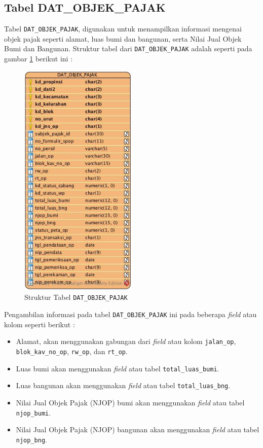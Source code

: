 \subsection{Tabel DAT\_OBJEK\_PAJAK}

Tabel \texttt{DAT\_OBJEK\_PAJAK}, digunakan untuk menampilkan informasi mengenai objek pajak seperti alamat, luas bumi dan bangunan, serta Nilai Jual Objek Bumi dan Bangunan. Struktur tabel dari \texttt{DAT\_OBJEK\_PAJAK} adalah seperti pada gambar \ref{fig:struktur-dat-op} berikut ini :

\begin{figure}[H]
	\centering
	\includegraphics[width=0.5\textwidth]{./resources/struktur-tabel-dat-op}
	\caption{Struktur Tabel \texttt{DAT\_OBJEK\_PAJAK}}
	\label{fig:struktur-dat-op}
\end{figure}

Pengambilan informasi pada tabel \texttt{DAT\_OBJEK\_PAJAK} ini pada beberapa \textit{field} atau kolom seperti berikut :

\begin{itemize}
	\item Alamat, akan menggunakan gabungan dari \textit{field} atau kolom \texttt{jalan\_op}, \texttt{blok\_kav\_no\_op}, \texttt{rw\_op}, dan \texttt{rt\_op}.
	\item Luas bumi akan menggunakan \textit{field} atau tabel \texttt{total\_luas\_bumi}.
	\item Luas bangunan akan menggunakan \textit{field} atau tabel \texttt{total\_luas\_bng}.
	\item Nilai Jual Objek Pajak (NJOP) bumi akan menggunakan \textit{field} atau tabel \texttt{njop\_bumi}.
	\item Nilai Jual Objek Pajak (NJOP) bangunan akan menggunakan \textit{field} atau tabel \texttt{njop\_bng}.
\end{itemize}

